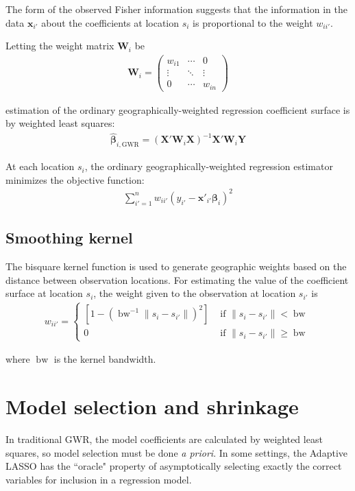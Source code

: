 \documentclass[authoryear, review, 11pt]{elsarticle}
\DeclareMathOperator*{\bw}{\mbox{bw}}
\begin{document}
	The form of the observed Fisher information suggests that the information in the data $\bm{x}_{i'}$ about the coefficients at location $s_i$ is proportional to the weight $w_{ii'}$. 
	
	Letting the weight matrix $\bm{W}_i$ be	
	\begin{eqnarray}
		\bm{W}_i =  \left( \begin{array}{ccc} w_{i1} & \cdots & 0 \\ \vdots & \ddots & \vdots \\ 0 & \cdots & w_{in} \end{array} \right)
	\end{eqnarray}
	
	estimation of the ordinary geographically-weighted regression coefficient surface is by weighted least squares:	
	\begin{eqnarray}
		\hat{\bm{\beta}}_{i, \mbox{GWR}} = \left( \bm{X}'\bm{W}_i\bm{X} \right)^{-1} \bm{X}'\bm{W}_i\bm{Y}
	\end{eqnarray}
	
	
	At each location $s_i$, the ordinary geographically-weighted regression estimator minimizes the objective function:
	\begin{eqnarray}
		\sum_{i'=1}^n w_{ii'} \left(y_{i'} - \bm{x}'_{i'} \bm{\beta}_i \right)^2
	\end{eqnarray}
	
	 
	 \subsection{Smoothing kernel}
	 	The bisquare kernel function is used to generate geographic weights based on the distance between observation locations. For estimating the value of the coefficient surface at location $s_i$, the weight given to the observation at location $s_{i'}$ is	
	\begin{eqnarray}
		w_{ii'} = \begin{cases} \left[ 1-\left( \bw^{-1} \|s_i-s_{i'}\| \right)^2 \right] & \mbox{ if } \|s_i-s_{i'}\| < \bw \\ 0 & \mbox{ if } \|s_i-s_{i'}\| \geq \bw \end{cases}
	\end{eqnarray}
	
	where $\bw$ is the kernel bandwidth.\\
	
\section{Model selection and shrinkage \label{section:method}}
	In traditional GWR, the model coefficients are calculated by weighted least squares, so model selection must be done \emph{a priori}. In some settings, the Adaptive LASSO \citep{Zou:2006} has the ``oracle" property of asymptotically selecting exactly the correct variables for inclusion in a regression model.\\
\end{document}
